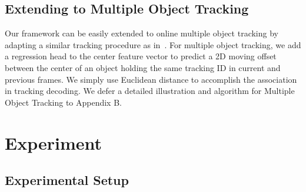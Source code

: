 \documentclass[10pt,twocolumn,letterpaper]{article}
\begin{document}
\subsection{Extending to Multiple Object Tracking}

Our framework can be easily extended to online multiple object tracking by adapting a similar tracking procedure as in~\cite{zhou2020tracking}. For multiple object tracking, we add a regression head to the center feature vector to predict a 2D moving offset between the center of an object holding the same tracking ID in current and previous frames. We simply use Euclidean distance to accomplish the association in tracking decoding. We defer a detailed illustration and algorithm for Multiple Object Tracking to Appendix B.



\section{Experiment}



\subsection{Experimental Setup}
\end{document}
